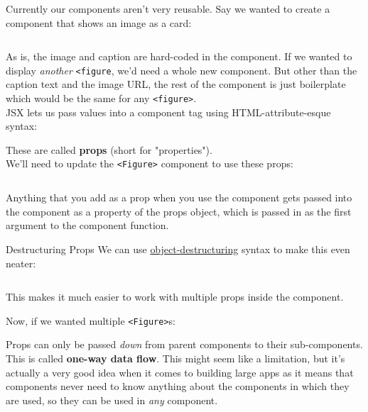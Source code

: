 Currently our components aren't very reusable. Say we wanted to create a component that shows an image as a card:

\inputminted{jsx}{01/figures/03/01-Figure.jsx}

As is, the image and caption are hard-coded in the component. If we wanted to display \textit{another} \texttt{<figure}, we'd need a whole new component. But other than the caption text and the image URL, the rest of the component is just boilerplate which would be the same for any \texttt{<figure>}.
\\

JSX lets us pass values into a component tag using HTML-attribute-esque syntax:


These are called \textbf{props} (short for "properties").
\\

We'll need to update the \texttt{<Figure>} component to use these props:

\inputminted{jsx}{01/figures/03/03-Figure-props.jsx}

Anything that you add as a prop when you use the component gets passed into the component as a property of the props object, which is passed in as the first argument to the component function.

\begin{infobox}{Destructuring Props}
    We can use \href{https://developer.mozilla.org/en-US/docs/Web/JavaScript/Reference/Operators/Destructuring_assignment}{object-destructuring} syntax to make this even neater:

    \inputminted{jsx}{01/figures/03/04-Figure-destructure.jsx}

    This makes it much easier to work with multiple props inside the component.
\end{infobox}

Now, if we wanted multiple \texttt{<Figure>}s:


Props can only be passed \textit{down} from parent components to their sub-components. This is called \textbf{one-way data flow}. This might seem like a limitation, but it's actually a very good idea when it comes to building large apps as it means that components never need to know anything about the components in which they are used, so they can be used in \textit{any} component.
\\

